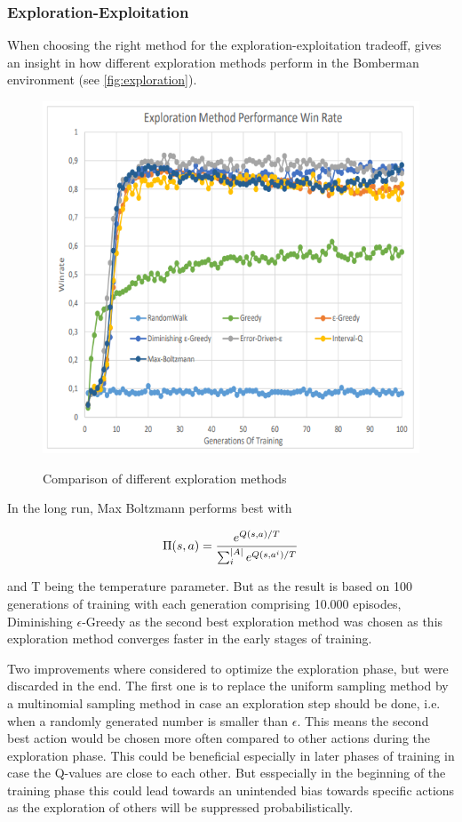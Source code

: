\subsubsection{Exploration-Exploitation}
\label{ch:approachBa}

When choosing the right method for the exploration-exploitation tradeoff, \cite{Kormelink2018} gives an insight in how different exploration methods perform in the Bomberman environment (see \autoref{fig:exploration}). 

\begin{figure}[ht]
	\centering
	\includegraphics[width=0.6\linewidth]{figures/exploration.PNG}
	\caption{Comparison of different exploration methods}
	\label{fig:exploration}
	\cite{Kormelink2018}
\end{figure}

In the long run, Max Boltzmann performs best with 

\begin{equation}
	\Pi(s,a) = \frac{e^{Q(s,a)/T}}{\sum_i^{\lvert A\rvert}e^{Q(s,a^i)/T}}
\end{equation}

and T being the temperature parameter. But as the result is based on 100 generations of training with each generation comprising 10.000 episodes, Diminishing $\epsilon$-Greedy as the second best exploration method was chosen as this exploration method converges faster in the early stages of training.

Two improvements where considered to optimize the exploration phase, but were discarded in the end. The first one is to replace the uniform sampling method by a multinomial sampling method in case an exploration step should be done, i.e. when a randomly generated number is smaller than $\epsilon$. This means the second best action would be chosen more often compared to other actions during the exploration phase. This could be beneficial especially in later phases of training in case the Q-values are close to each other. But esspecially in the beginning of the training phase this could lead towards an unintended bias towards specific actions as the exploration of others will be suppressed probabilistically.

